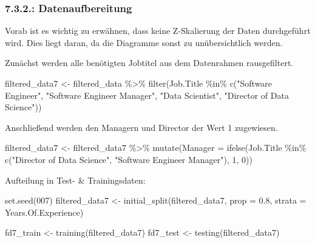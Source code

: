 \documentclass[
  letterpaper,
  DIV=11,
  numbers=noendperiod]{scrartcl}
\newenvironment{Shaded}{\begin{snugshade}}{\end{snugshade}}
\newcommand{\AttributeTok}[1]{\textcolor[rgb]{0.40,0.45,0.13}{#1}}
\newcommand{\DecValTok}[1]{\textcolor[rgb]{0.68,0.00,0.00}{#1}}
\newcommand{\FloatTok}[1]{\textcolor[rgb]{0.68,0.00,0.00}{#1}}
\newcommand{\FunctionTok}[1]{\textcolor[rgb]{0.28,0.35,0.67}{#1}}
\newcommand{\NormalTok}[1]{\textcolor[rgb]{0.00,0.23,0.31}{#1}}
\newcommand{\OtherTok}[1]{\textcolor[rgb]{0.00,0.23,0.31}{#1}}
\newcommand{\SpecialCharTok}[1]{\textcolor[rgb]{0.37,0.37,0.37}{#1}}
\newcommand{\StringTok}[1]{\textcolor[rgb]{0.13,0.47,0.30}{#1}}
\begin{document}
\hypertarget{datenaufbereitung-3}{%
\subsubsection{7.3.2.: Datenaufbereitung}\label{datenaufbereitung-3}}

Vorab ist es wichtig zu erwähnen, dass keine Z-Skalierung der Daten
durchgeführt wird. Dies liegt daran, da die Diagramme sonst zu
unübersichtlich werden.

Zunächst werden alle benötigten Jobtitel aus dem Datenrahmen
rausgefiltert.

\begin{Shaded}
\begin{Highlighting}[]
\NormalTok{filtered\_data7 }\OtherTok{\textless{}{-}}\NormalTok{ filtered\_data }\SpecialCharTok{\%\textgreater{}\%}
  \FunctionTok{filter}\NormalTok{(Job.Title }\SpecialCharTok{\%in\%} \FunctionTok{c}\NormalTok{(}\StringTok{"Software Engineer"}\NormalTok{, }\StringTok{"Software Engineer Manager"}\NormalTok{, }\StringTok{"Data Scientist"}\NormalTok{, }\StringTok{"Director of Data Science"}\NormalTok{))}
\end{Highlighting}
\end{Shaded}

Anschließend werden den Managern und Director der Wert 1 zugewiesen.

\begin{Shaded}
\begin{Highlighting}[]
\NormalTok{filtered\_data7 }\OtherTok{\textless{}{-}}\NormalTok{ filtered\_data7 }\SpecialCharTok{\%\textgreater{}\%}
  \FunctionTok{mutate}\NormalTok{(}\AttributeTok{Manager =} \FunctionTok{ifelse}\NormalTok{(Job.Title }\SpecialCharTok{\%in\%} \FunctionTok{c}\NormalTok{(}\StringTok{"Director of Data Science"}\NormalTok{, }\StringTok{"Software Engineer Manager"}\NormalTok{), }\DecValTok{1}\NormalTok{, }\DecValTok{0}\NormalTok{))}
\end{Highlighting}
\end{Shaded}

Aufteilung in Test- \& Trainingsdaten:

\begin{Shaded}
\begin{Highlighting}[]
\FunctionTok{set.seed}\NormalTok{(}\DecValTok{007}\NormalTok{)  }
\NormalTok{filtered\_data7 }\OtherTok{\textless{}{-}} \FunctionTok{initial\_split}\NormalTok{(filtered\_data7, }\AttributeTok{prop =} \FloatTok{0.8}\NormalTok{, }\AttributeTok{strata =}\NormalTok{ Years.Of.Experience)  }

\NormalTok{fd7\_train }\OtherTok{\textless{}{-}} \FunctionTok{training}\NormalTok{(filtered\_data7)}
\NormalTok{fd7\_test }\OtherTok{\textless{}{-}} \FunctionTok{testing}\NormalTok{(filtered\_data7)}
\end{Highlighting}
\end{Shaded}
\end{document}
